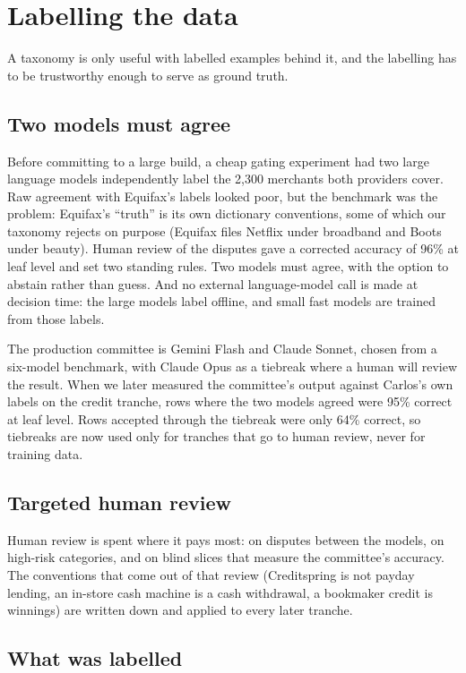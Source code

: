 \section{Labelling the data}
A taxonomy is only useful with labelled examples behind it, and the labelling has to be trustworthy enough to serve as ground truth.

\subsection{Two models must agree}
Before committing to a large build, a cheap gating experiment had two large language models independently label the 2,300 merchants both providers cover. Raw agreement with Equifax's labels looked poor, but the benchmark was the problem: Equifax's ``truth'' is its own dictionary conventions, some of which our taxonomy rejects on purpose (Equifax files Netflix under broadband and Boots under beauty). Human review of the disputes gave a corrected accuracy of 96\% at leaf level and set two standing rules. Two models must agree, with the option to abstain rather than guess. And no external language-model call is made at decision time: the large models label offline, and small fast models are trained from those labels.

The production committee is Gemini Flash and Claude Sonnet, chosen from a six-model benchmark, with Claude Opus as a tiebreak where a human will review the result. When we later measured the committee's output against Carlos's own labels on the credit tranche, rows where the two models agreed were 95\% correct at leaf level. Rows accepted through the tiebreak were only 64\% correct, so tiebreaks are now used only for tranches that go to human review, never for training data.

\subsection{Targeted human review}
Human review is spent where it pays most: on disputes between the models, on high-risk categories, and on blind slices that measure the committee's accuracy. The conventions that come out of that review (Creditspring is not payday lending, an in-store cash machine is a cash withdrawal, a bookmaker credit is winnings) are written down and applied to every later tranche.

\subsection{What was labelled}

